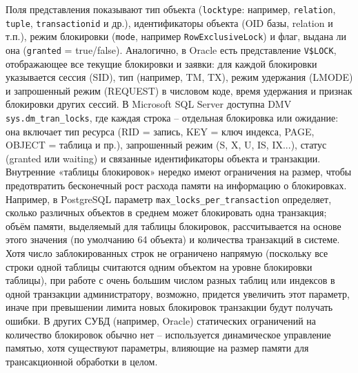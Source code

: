  Поля представления показывают тип объекта (\texttt{locktype}: например, \texttt{relation}, \texttt{tuple}, \texttt{transactionid} и др.), идентификаторы объекта (OID базы, relation и т.п.), режим блокировки (\texttt{mode}, например \texttt{RowExclusiveLock}) и флаг, выдана ли она (\texttt{granted} = true/false). Аналогично, в Oracle есть представление \texttt{V\$LOCK}, отображающее все текущие блокировки и заявки: для каждой блокировки указывается сессия (SID), тип (например, TM, TX), режим удержания (LMODE) и запрошенный режим (REQUEST) в числовом коде, время удержания и признак блокировки других сессий. В Microsoft SQL Server доступна DMV \texttt{sys.dm\_tran\_locks}, где каждая строка – отдельная блокировка или ожидание: она включает тип ресурса (RID = запись, KEY = ключ индекса, PAGE, OBJECT = таблица и пр.), запрошенный режим (S, X, U, IS, IX...), статус (granted или waiting) и связанные идентификаторы объекта и транзакции. Внутренние «таблицы блокировок» нередко имеют ограничения на размер, чтобы предотвратить бесконечный рост расхода памяти на информацию о блокировках. Например, в PostgreSQL параметр \texttt{max\_locks\_per\_transaction} определяет, сколько различных объектов в среднем может блокировать одна транзакция; объём памяти, выделяемый для таблицы блокировок, рассчитывается на основе этого значения (по умолчанию 64 объекта) и количества транзакций в системе. Хотя число заблокированных строк не ограничено напрямую (поскольку все строки одной таблицы считаются одним объектом на уровне блокировки таблицы), при работе с очень большим числом разных таблиц или индексов в одной транзакции администратору, возможно, придется увеличить этот параметр, иначе при превышении лимита новых блокировок транзакции будут получать ошибки. В других СУБД (например, Oracle) статических ограничений на количество блокировок обычно нет – используется динамическое управление памятью, хотя существуют параметры, влияющие на размер памяти для трансакционной обработки в целом. 
 
